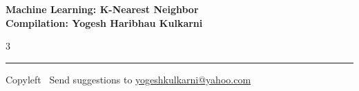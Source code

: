 \documentclass[8pt,landscape]{article}
\begin{document}
\footnotesize


\begin{center}
\Large{\textbf{Machine Learning: K-Nearest Neighbor\\ Compilation: Yogesh Haribhau Kulkarni}}
\end{center}

\begin{multicols}{3}

\end{multicols}

\rule{\linewidth}{0.25pt}
\scriptsize
Copyleft \textcopyleft\  Send suggestions to
\href{http://www.yogeshkulkarni.com}{yogeshkulkarni@yahoo.com}
\end{document}
